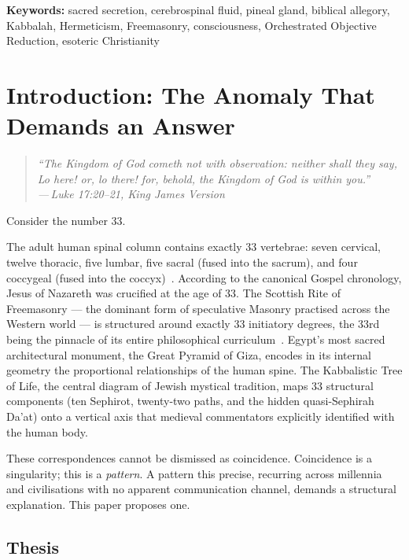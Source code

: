 \documentclass[12pt, a4paper]{article}
\newcommand{\epigraph}[2]{%
  \begin{quote}
    \itshape ``#1''\\[0.3em]
    \normalfont\small\hfill ---\,#2
  \end{quote}
}
\begin{document}
\begin{titlepage}
  \vspace{1cm}
  \noindent\textbf{Keywords:} sacred secretion, cerebrospinal fluid, pineal gland,
  biblical allegory, Kabbalah, Hermeticism, Freemasonry, consciousness,
  Orchestrated Objective Reduction, esoteric Christianity

\end{titlepage}

\newpage
\tableofcontents
\newpage

\section{Introduction: The Anomaly That Demands an Answer}

\epigraph{The Kingdom of God cometh not with observation: neither shall they
say, Lo here! or, lo there! for, behold, the Kingdom of God is within
you.}{Luke 17:20--21, King James Version}

Consider the number 33.

The adult human spinal column contains exactly 33 vertebrae: seven cervical,
twelve thoracic, five lumbar, five sacral (fused into the sacrum), and four
coccygeal (fused into the coccyx)~\autocite[97]{gray2016}. According to the
canonical Gospel chronology, Jesus of Nazareth was crucified at the age of
33. The Scottish Rite of Freemasonry — the dominant form of speculative
Masonry practised across the Western world — is structured around exactly 33
initiatory degrees, the 33rd being the pinnacle of its entire philosophical
curriculum~\autocite[860]{mackey1874}. Egypt's most sacred architectural
monument, the Great Pyramid of Giza, encodes in its internal geometry the
proportional relationships of the human spine. The Kabbalistic Tree of Life,
the central diagram of Jewish mystical tradition, maps 33 structural
components (ten Sephirot, twenty-two paths, and the hidden quasi-Sephirah
Da'at) onto a vertical axis that medieval commentators explicitly identified
with the human body.

These correspondences cannot be dismissed as coincidence. Coincidence is a
singularity; this is a \emph{pattern}. A pattern this precise, recurring
across millennia and civilisations with no apparent communication channel,
demands a structural explanation. This paper proposes one.

\subsection{Thesis}
\end{document}

